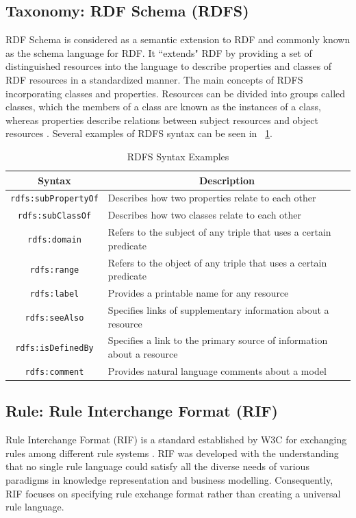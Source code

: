 \subsection{Taxonomy: RDF Schema (RDFS)}
RDF Schema is considered as a semantic extension to RDF and commonly known as the schema language for RDF. It ``extends" RDF by providing a set of distinguished resources into the language \citep{swont2011} to describe properties and classes of RDF resources in a standardized manner. The main concepts of RDFS incorporating classes and properties. Resources can be divided into groups called classes, which the members of a class are known as the instances of a class, whereas properties describe relations between subject resources and object resources \citep{rdfsw3c}. Several examples of RDFS syntax can be seen in  \tab~\ref{tab:rdfs-syntax}.

\begin{table}
    \centering
    \begin{tabularx}{\textwidth}{|c|X|}
        \hline
         \textbf{Syntax} & \multicolumn{1}{c|}{\textbf{Description}} \\
        \hline
         \texttt{rdfs:subPropertyOf} & Describes how two properties relate to each other \\
         \texttt{rdfs:subClassOf} & Describes how two classes relate to each other \\
         \texttt{rdfs:domain} & Refers to the subject of any triple that uses a certain predicate \\
         \texttt{rdfs:range} & Refers to the object of any triple that uses a certain predicate \\
         \texttt{rdfs:label} & Provides a printable name for any resource \\
         \texttt{rdfs:seeAlso} & Specifies links of supplementary information about a resource \\
         \texttt{rdfs:isDefinedBy} & Specifies a link to the primary source of information about a resource \\
         \texttt{rdfs:comment} & Provides natural language comments about a model \\
        \hline
    \end{tabularx}
    \caption{RDFS Syntax Examples \citep{swont2011}}
    \label{tab:rdfs-syntax}
\end{table}

\subsection{Rule: Rule Interchange Format (RIF)}
Rule Interchange Format (RIF) is a standard established by W3C for exchanging rules among different rule systems \citep{w3crif}. RIF was developed with the understanding that no single rule language could satisfy all the diverse needs of various paradigms in knowledge representation and business modelling. Consequently, RIF focuses on specifying rule exchange format rather than creating a universal rule language. 

